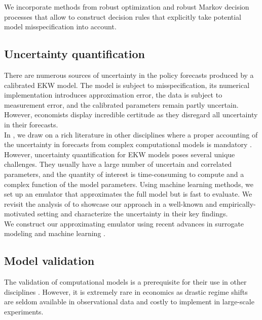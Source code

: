 \noindent We incorporate methods from robust optimization \citep{Ben-Tal.2009, Rahimian.2019, Wiesemann.2014} and robust Markov decision processes \citep{Iyengar.2005, Nilim.2005} that allow to construct decision rules that explicitly take potential model misspecification into account.
\subsection{Uncertainty quantification}
There are numerous sources of uncertainty in the policy forecasts produced by a calibrated EKW model. The model is subject to misspecification, its numerical implementation introduces approximation error, the data is subject to measurement error, and the calibrated parameters remain partly uncertain. However, economists display incredible certitude as they disregard all uncertainty \citep{Manski.2013} in their forecasts.\\

\noindent In \citet{Eisenhauer.2020d}, we draw on a rich literature in other disciplines where a proper accounting of the uncertainty in forecasts from complex computational models is mandatory \citep{Saltelli.2004, Saltelli.2008, Smith.2014}. However, uncertainty quantification for EKW models poses several unique challenges. They usually have a large number of uncertain and correlated parameters, and the quantity of interest is time-consuming to compute and a complex function of the model parameters. Using machine learning methods, we set up an emulator that approximates the full model but is fast to evaluate. We revisit the analysis of \citet{Keane.1994, Keane.1997} to showcase our approach in a well-known and empirically-motivated setting and characterize the uncertainty in their key findings.\\

\noindent We construct our approximating emulator using recent advances in surrogate modeling \citep{Forrester.2008} and machine learning \citep{Hastie.2008, Murphy.2012}.
\subsection{Model validation}
The validation of computational models is a prerequisite for their use in other disciplines \citep{Adams.2012, Oberkampf.2010}. However, it is extremely rare in economics as drastic regime shifts are seldom available in observational data and costly to implement in large-scale experiments.\\

